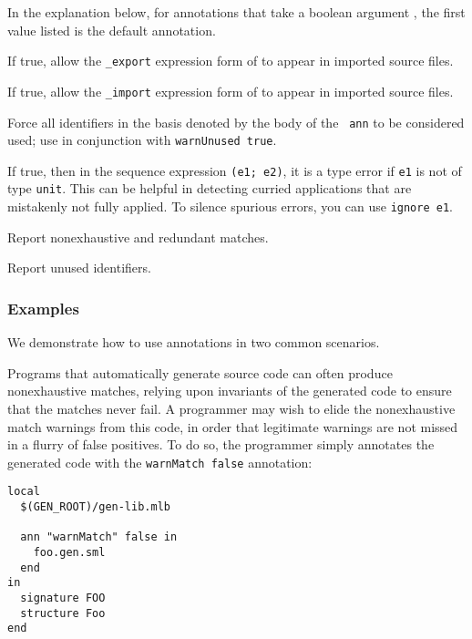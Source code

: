 In the explanation below, for annotations that take a boolean argument
{\tt \trueFalse}, the first value listed is the default annotation.

\begin{description}
If true, allow the {\tt \_export} expression form of  to
appear in imported source files.

If true, allow the {\tt \_import} expression form of  to
appear in imported source files.

Force all identifiers in the basis denoted by the body of the {\tt
ann} to be considered used; use in conjunction with {\tt warnUnused
true}.

If true, then in the sequence expression {\tt (e1; e2)}, it is a type
error if {\tt e1} is not of type {\tt unit}.  This can be helpful in
detecting curried applications that are mistakenly not fully applied.
To silence spurious errors, you can use {\tt ignore e1}.

Report nonexhaustive and redundant matches.

Report unused identifiers.
\end{description}

%
\subsubsection{Examples}

We demonstrate how to use annotations in two common scenarios.

Programs that automatically generate source code can often produce
nonexhaustive matches, relying upon invariants of the generated code
to ensure that the matches never fail.  A programmer may wish to elide
the nonexhaustive match warnings from this code, in order that
legitimate warnings are not missed in a flurry of false positives.  To
do so, the programmer simply annotates the generated code with the
{\tt warnMatch false} annotation:
\begin{verbatim}
local
  $(GEN_ROOT)/gen-lib.mlb

  ann "warnMatch" false in
    foo.gen.sml
  end
in
  signature FOO
  structure Foo
end
\end{verbatim}

